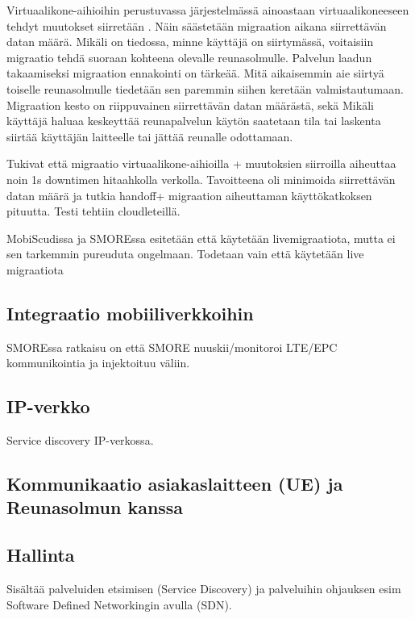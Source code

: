\documentclass[finnish]{tktltiki2}
\theoremstyle{definition}
\theoremstyle{remark}
\begin{document}
Virtuaalikone-aihioihin perustuvassa järjestelmässä ainoastaan virtuaalikoneeseen tehdyt muutokset siirretään \cite{RefWorks:doc:5a65a533e4b0451a693fbf8e}. Näin säästetään migraation aikana siirrettävän datan määrä.
Mikäli on tiedossa, minne käyttäjä on siirtymässä, voitaisiin migraatio tehdä suoraan kohteena olevalle reunasolmulle.
Palvelun laadun takaamiseksi migraation ennakointi on tärkeää. Mitä aikaisemmin aie siirtyä toiselle reunasolmulle tiedetään sen paremmin siihen keretään valmistautumaan. 
Migraation kesto on riippuvainen siirrettävän datan määrästä, sekä
Mikäli käyttäjä haluaa keskeyttää reunapalvelun käytön saatetaan tila tai laskenta siirtää käyttäjän laitteelle tai jättää reunalle odottamaan.

\cite{ha2015adaptive} Tukivat että migraatio virtuaalikone-aihioilla + muutoksien siirroilla aiheuttaa noin 1s downtimen hitaahkolla verkolla. Tavoitteena oli minimoida siirrettävän datan määrä ja tutkia handoff+ migraation aiheuttaman käyttökatkoksen pituutta. Testi tehtiin cloudleteillä.

MobiScudissa ja SMOREssa esitetään että käytetään livemigraatiota, mutta ei sen tarkemmin pureuduta ongelmaan. Todetaan vain että käytetään live migraatiota
\subsection{Integraatio mobiiliverkkoihin}
SMOREssa ratkaisu on että SMORE nuuskii/monitoroi LTE/EPC kommunikointia ja injektoituu väliin.

\subsection{IP-verkko}
Service discovery IP-verkossa.
\subsection{Kommunikaatio asiakaslaitteen (UE) ja Reunasolmun kanssa}
\subsection{Hallinta}
Sisältää palveluiden etsimisen (Service Discovery) ja palveluihin ohjauksen esim Software Defined Networkingin avulla (SDN).
\end{document}
